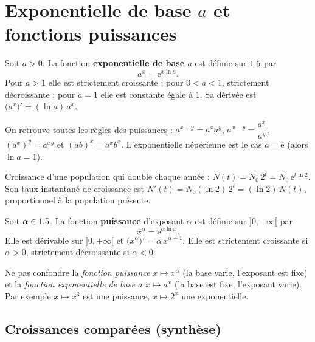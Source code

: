 \section{Exponentielle de base $a$ et fonctions puissances}

\begin{definition}
Soit $a>0$. La fonction \textbf{exponentielle de base $a$} est définie sur $1.5$ par
\[
a^{x}=\mathrm{e}^{x\ln a}.
\]
Pour $a>1$ elle est strictement croissante ; pour $0<a<1$, strictement décroissante ;
pour $a=1$ elle est constante égale à $1$. Sa dérivée est $\big(a^{x}\big)'=(\ln a)\,a^{x}$.
\end{definition}

\begin{remarque}
On retrouve toutes les règles des puissances : $a^{x+y}=a^{x}a^{y}$,
$a^{x-y}=\dfrac{a^{x}}{a^{y}}$, $(a^{x})^{y}=a^{xy}$ et $(ab)^{x}=a^{x}b^{x}$.
L'exponentielle népérienne est le cas $a=\mathrm{e}$ (alors $\ln a=1$).
\end{remarque}

\begin{exemple}
Croissance d'une population qui double chaque année : $N(t)=N_0\,2^{t}=N_0\,\mathrm{e}^{t\ln 2}$.
Son taux instantané de croissance est $N'(t)=N_0(\ln 2)\,2^{t}=(\ln 2)\,N(t)$, proportionnel
à la population présente.
\end{exemple}

\begin{definition}
Soit $\alpha\in1.5$. La fonction \textbf{puissance} d'exposant $\alpha$ est définie sur
$]0,+\infty[$ par
\[
x^{\alpha}=\mathrm{e}^{\alpha\ln x}.
\]
Elle est dérivable sur $]0,+\infty[$ et $\big(x^{\alpha}\big)'=\alpha\,x^{\alpha-1}$.
Elle est strictement croissante si $\alpha>0$, strictement décroissante si $\alpha<0$.
\end{definition}

\begin{remarque}
Ne pas confondre la \emph{fonction puissance} $x\mapsto x^{\alpha}$ (la base varie, l'exposant
est fixe) et la \emph{fonction exponentielle de base $a$} $x\mapsto a^{x}$ (la base est fixe,
l'exposant varie). Par exemple $x\mapsto x^{3}$ est une puissance, $x\mapsto 2^{x}$ une
exponentielle.
\end{remarque}

\subsection*{Croissances comparées (synthèse)}

